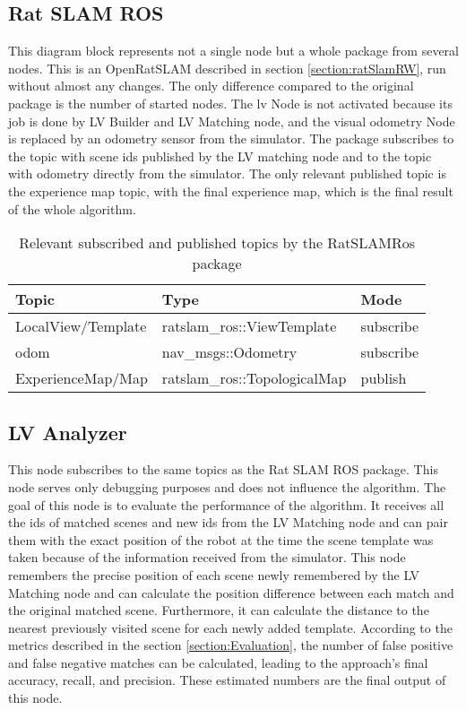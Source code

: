 \subsection{Rat SLAM ROS}

This diagram block represents not a single node but a whole package from several nodes. This is an OpenRatSLAM described in section \ref{section:ratSlamRW}, run without almost any changes. The only difference compared to the original package is the number of started nodes. The lv Node is not activated because its job is done by LV Builder and LV Matching node, and the visual odometry Node is replaced by an odometry sensor from the simulator. The package subscribes to the topic with scene ids published by the LV matching node and to the topic with odometry directly from the simulator. The only relevant published topic is the experience map topic, with the final experience map, which is the final result of the whole algorithm.

\begin{table}[htpb]
    \caption{Relevant subscribed and published topics by the RatSLAMRos package}\label{tab:ratslamTopics}
    \centering
    \begin{tabular}{l l l}
        \toprule
        Topic              & Type                         & Mode      \\
        \midrule
        LocalView/Template & ratslam\_ros::ViewTemplate   & subscribe \\
        odom               & nav\_msgs::Odometry          & subscribe \\
        ExperienceMap/Map  & ratslam\_ros::TopologicalMap & publish   \\
        \bottomrule
    \end{tabular}
\end{table}

\subsection{LV Analyzer}

This node subscribes to the same topics as the Rat SLAM ROS package. This node serves only debugging purposes and does not influence the algorithm. The goal of this node is to evaluate the performance of the algorithm. It receives all the ids of matched scenes and new ids from the LV Matching node and can pair them with the exact position of the robot at the time the scene template was taken because of the information received from the simulator. This node remembers the precise position of each scene newly remembered by the LV Matching node and can calculate the position difference between each match and the original matched scene. Furthermore, it can calculate the distance to the nearest previously visited scene for each newly added template. According to the metrics described in the section \ref{section:Evaluation}, the number of false positive and false negative matches can be calculated, leading to the approach's final accuracy, recall, and precision. These estimated numbers are the final output of this node.


